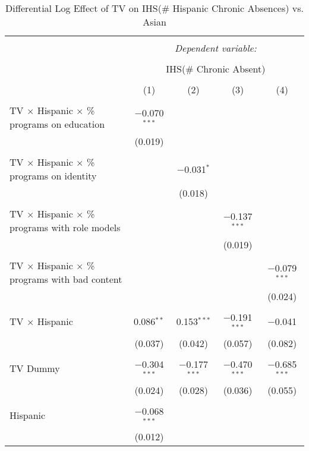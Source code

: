 
\begin{table}[!htbp] \centering 
  \caption{Differential Log Effect of TV on IHS(\# Hispanic Chronic Absences) vs. Asian} 
  \label{} 
\begin{tabular}{@{\extracolsep{-2pt}}lcccc} 
\\[-1.8ex]\hline 
\hline \\[-1.8ex] 
 & \multicolumn{4}{c}{\textit{Dependent variable:}} \\ 
\cline{2-5} 
\\[-1.8ex] & \multicolumn{4}{c}{IHS(\# Chronic Absent)} \\ 
\\[-1.8ex] & (1) & (2) & (3) & (4)\\ 
\hline \\[-1.8ex] 
 TV $\times$ Hispanic $\times$ \% programs on education & $-$0.070$^{***}$ &  &  &  \\ 
  & (0.019) &  &  &  \\ 
  & & & & \\ 
 TV $\times$ Hispanic $\times$ \% programs on identity &  & $-$0.031$^{*}$ &  &  \\ 
  &  & (0.018) &  &  \\ 
  & & & & \\ 
 TV $\times$ Hispanic $\times$ \% programs with role models &  &  & $-$0.137$^{***}$ &  \\ 
  &  &  & (0.019) &  \\ 
  & & & & \\ 
 TV $\times$ Hispanic $\times$ \% programs with bad content &  &  &  & $-$0.079$^{***}$ \\ 
  &  &  &  & (0.024) \\ 
  & & & & \\ 
 TV $\times$ Hispanic & 0.086$^{**}$ & 0.153$^{***}$ & $-$0.191$^{***}$ & $-$0.041 \\ 
  & (0.037) & (0.042) & (0.057) & (0.082) \\ 
  & & & & \\ 
 TV Dummy & $-$0.304$^{***}$ & $-$0.177$^{***}$ & $-$0.470$^{***}$ & $-$0.685$^{***}$ \\ 
  & (0.024) & (0.028) & (0.036) & (0.055) \\ 
  & & & & \\ 
 Hispanic & $-$0.068$^{***}$ &  &  &  \\ 
  & (0.012) &  &  &  \\ 

\end{tabular}
\end{table}
